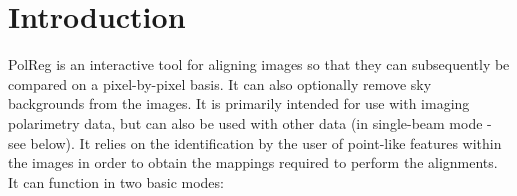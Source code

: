  \newpage
 \begin{latexonly}
   \setlength{\parskip}{0mm}
   \latexonlytoc
   \setlength{\parskip}{\medskipamount}
   \markright{\stardocname}
 \end{latexonly}
\newpage
\renewcommand{\thepage}{\arabic{page}}
\setcounter{page}{1}

\section {Introduction}
PolReg is an interactive tool for aligning images so that they can
subsequently be compared on a pixel-by-pixel basis. It can also
optionally remove sky backgrounds from the images. It is primarily
intended for use with imaging polarimetry data, but can also be used with
other data (in single-beam mode - see below). It relies on the
identification by the user of point-like features within the images in
order to obtain the mappings required to perform the alignments. It can
function in two basic modes:

